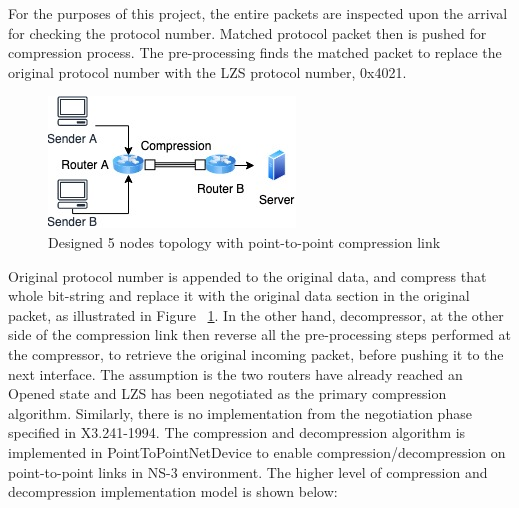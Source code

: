 \documentclass[sigconf]{acmart}
\begin{document}
 
 
For the purposes of this project, the entire packets are inspected upon the arrival for checking the protocol number.  Matched protocol packet then is pushed for compression process. The pre-processing  finds the matched packet to replace the original protocol number with the LZS protocol number, 0x4021. 

\begin{figure}[h]
  \centering
  \includegraphics[width=\linewidth]{Topology}
  \caption{Designed 5 nodes topology with point-to-point compression link }
  \label{fig:Topo}
\end{figure}

Original protocol number is appended to the original data, and compress that whole bit-string and replace it with the original data section in the original packet, as illustrated in Figure ~\ref{fig:Topo}. 
In the other hand, decompressor, at the other side of the compression link then reverse all the pre-processing steps performed at the compressor, to retrieve the original incoming packet, before pushing it to the next interface. The assumption is the two routers have already reached an Opened state and LZS has been negotiated as the primary compression algorithm. Similarly, there is no implementation from the negotiation phase specified in X3.241-1994. The compression and decompression algorithm is implemented in PointToPointNetDevice to enable compression/decompression on point-to-point links in NS-3 environment. The higher level of compression and decompression implementation model is shown below:
\end{document}
